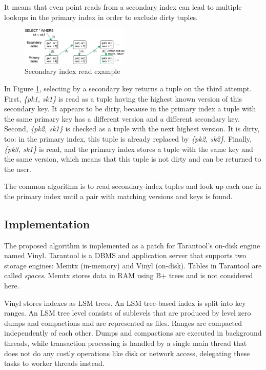 \documentclass{vldb}
\begin{document}
It means that even point reads from a secondary index can lead to multiple
lookups in the primary index in order to exclude dirty tuples.
\begin{figure}
\centering
\includegraphics[width=0.46\textwidth]{secondary_reading_example}
\caption{Secondary index read example}
\label{fig:secondary_reading_example}
\end{figure}
In Figure \ref{fig:secondary_reading_example}, selecting by a secondary key
returns a tuple on the third attempt. First, \textit{\{pk1, sk1\}} is read as a tuple having
the highest known version of this secondary key. It appears to be dirty, because
in the primary index a tuple with the same primary key has a different version and
a different secondary key. Second, \textit{\{pk2, sk1\}} is checked as a tuple with
the next highest version. It is dirty, too: in the primary index, this tuple is already
replaced by \textit{\{pk2, sk2\}}. Finally, \textit{\{pk3, sk1\}} is read, and the
primary index stores a tuple with the same key and the same version, which means
that this tuple is not dirty and can be returned to the user.

The common algorithm is to read secondary-index tuples and look up each one in the
primary index until a pair with matching versions and keys is found.

\subsection{Implementation}

The proposed algorithm is implemented as a patch for Tarantool's on-disk
engine named Vinyl. Tarantool is a DBMS and application server that supports two
storage engines: Memtx (in-memory) and Vinyl (on-disk). Tables in Tarantool are
called \textit{spaces}. Memtx stores data in RAM using B+ trees and is not
considered here.

Vinyl stores indexes as LSM trees. An LSM tree-based index is split into key
ranges. An LSM tree level consists of sublevels that are produced by level zero dumps and
compactions and are represented as files. Ranges are compacted independently of each
other. Dumps and compactions are executed in background threads, while transaction
processing is handled by a single main thread that does not do any costly operations like disk
or network access, delegating these tasks to worker threads instead.
\end{document}
